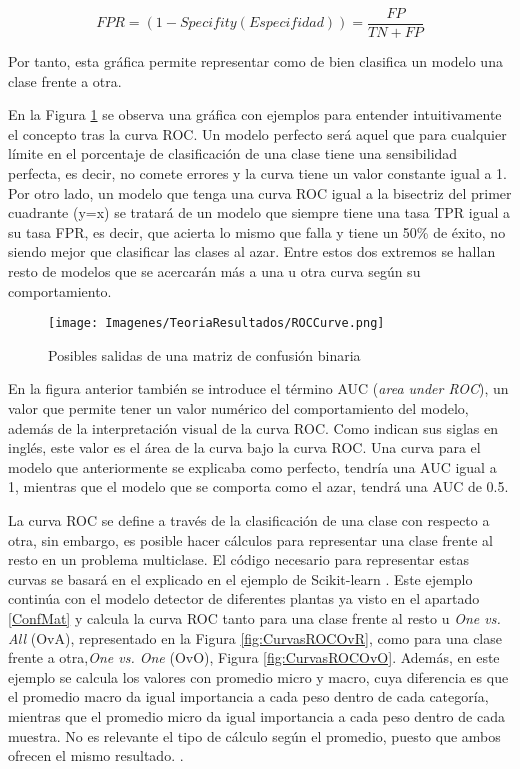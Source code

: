 \documentclass{report}
\begin{document}
\begin{equation}
    FPR = (1 - \textit{Specifity}(Especifidad)) = \frac{FP}{TN+FP}
    \label{eq:FPR}
\end{equation}

Por tanto, esta gráfica permite representar como de bien clasifica un modelo una clase frente a otra.

En la Figura \ref{fig:CurvaROC} se observa una gráfica con ejemplos para entender intuitivamente el concepto tras la curva ROC. Un modelo perfecto será aquel que para cualquier límite en el porcentaje de clasificación de una clase tiene una sensibilidad perfecta, es decir, no comete errores y la curva tiene un valor constante igual a 1. Por otro lado, un modelo que tenga una curva ROC igual a la bisectriz del primer cuadrante (y=x) se tratará de un modelo que siempre tiene una tasa TPR igual a su tasa FPR, es decir, que acierta lo mismo que falla y tiene un 50\% de éxito, no siendo mejor que clasificar las clases al azar. Entre estos dos extremos se hallan resto de modelos que se acercarán más a una u otra curva según su comportamiento.


\begin{figure}[hbpt]
	\centering
	 \texttt{[image: Imagenes/TeoriaResultados/ROCCurve.png]}
	 \caption{ Posibles salidas de una matriz de confusión binaria \cite{ROCCurveTeorica} }
	 \label{fig:CurvaROC}
\end{figure}

En la figura anterior también se introduce el término AUC (\textit{area under ROC}), un valor que permite tener un valor numérico del comportamiento del modelo, además de la interpretación visual de la curva ROC. Como indican sus siglas en inglés, este valor es el área de la curva bajo la curva ROC. Una curva para el modelo que anteriormente se explicaba como perfecto, tendría una AUC igual a 1, mientras que el modelo que se comporta como el azar, tendrá una AUC de 0.5.




La curva ROC se define a través de la clasificación de una clase con respecto a otra, sin embargo, es posible hacer cálculos para representar una clase frente al resto en un problema multiclase. El código necesario para representar estas curvas se basará en el explicado en el ejemplo de Scikit-learn \cite{ROCCurveGrafica}. Este ejemplo continúa con el modelo detector de diferentes plantas ya visto en el apartado \ref{ConfMat} y calcula la curva ROC tanto para una clase frente al resto u \textit{One vs. All} (OvA), representado en la Figura \ref{fig:CurvasROCOvR}, como para una clase frente a otra,\textit{One vs. One} (OvO), Figura \ref{fig:CurvasROCOvO}. Además, en este ejemplo se calcula los valores con promedio micro y macro, cuya diferencia es que el promedio macro da igual importancia a cada peso dentro de cada categoría, mientras que el promedio micro da igual importancia a cada peso dentro de cada muestra. No es relevante el tipo de cálculo según el promedio, puesto que ambos ofrecen el mismo resultado. \cite{MicrovsMacro}.
\end{document}
